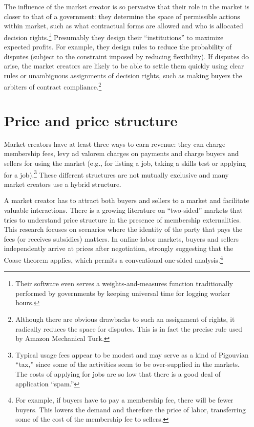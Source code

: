 \documentclass{llncs}
\begin{document}
The influence of the market creator is so pervasive that their role in
the market is closer to that of a government: they determine the space
of permissible actions within market, such as what contractual forms
are allowed and who is allocated decision rights.\footnote{Their
  software even serves a weights-and-measures function traditionally
  performed by governments by keeping universal time for logging
  worker hours.}  Presumably they design their ``institutions'' to
maximize expected profits. For example, they design rules to reduce
the probability of disputes (subject to the constraint imposed by
reducing flexibility). If disputes do arise, the market creators are
likely to be able to settle them quickly using clear rules or
unambiguous assignments of decision rights, such as making buyers the
arbiters of contract compliance.\footnote{Although there are obvious
  drawbacks to such an assignment of rights, it radically reduces the
  space for disputes. This is in fact the precise rule used by
  Amazon Mechanical Turk.}


\section{Price and price structure} 
Market creators have at least three ways to earn revenue: they can
charge membership fees, levy ad valorem charges on payments and charge
buyers and sellers for using the market (e.g., for listing a job,
taking a skills test or applying for a job).\footnote{Typical usage
  fees appear to be modest and may serve as a kind of Pigouvian
  ``tax,'' since some of the activities seem to be over-supplied in
  the markets. The costs of applying for jobs are so low that there is
  a good deal of application ``spam.''} These different structures are
not mutually exclusive and many market creators use a hybrid
structure.

A market creator has to attract both buyers and sellers to a market
and facilitate valuable interactions. There is a growing
literature on ``two-sided'' markets \cite{rochet2004two} that tries to
understand price structure in the presence of membership
externalities. This research focuses on scenarios where the identity
of the party that pays the fees (or receives subsidies) matters. In online labor markets, buyers and sellers
independently arrive at prices after negotiation, strongly suggesting
that the Coase theorem applies, which permits a conventional one-sided
analysis.\footnote{For example, if buyers have to pay a membership
  fee, there will be fewer buyers. This lowers the demand and
  therefore the price of labor, transferring some of the cost of the
  membership fee to sellers.}
\end{document}
